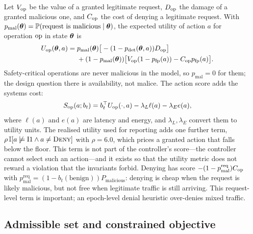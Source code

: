 Let $V_{\mathrm{op}}$ be the value of a granted legitimate request, $D_{\mathrm{op}}$ the damage
of a granted malicious one, and $C_{\mathrm{op}}$ the cost of denying a legitimate
request. With $p_{\mathrm{mal}}(\boldsymbol{\theta})=\mathbb{P}(\text{request is malicious}\mid\boldsymbol{\theta})$,
the expected utility of action $a$ for operation $\mathrm{op}$ in state $\boldsymbol{\theta}$ is
\begin{equation}
\begin{aligned}
  U_{\mathrm{op}}(\boldsymbol{\theta},a)={}&
  p_{\mathrm{mal}}(\boldsymbol{\theta})\big[-(1-p_{\mathrm{det}}(\boldsymbol{\theta},a))D_{\mathrm{op}}\big]\\
  &+(1-p_{\mathrm{mal}}(\boldsymbol{\theta}))\big[V_{\mathrm{op}}(1-p_{\mathrm{fp}}(a))-C_{\mathrm{op}}p_{\mathrm{fp}}(a)\big].
\end{aligned}
  \label{eq:utility}
\end{equation}
Safety-critical operations are never malicious in the model, so
$p_{\mathrm{mal}}=0$ for them; the design question there is availability, not
malice. The action score adds the systems cost:
\begin{equation}
  S_{\mathrm{op}}(a;b_t)=b_t^{\top}U_{\mathrm{op}}(\cdot,a)
  -\lambda_L\ell(a)-\lambda_E e(a),
  \label{eq:score}
\end{equation}
where $\ell(a)$ and $e(a)$ are latency and energy, and $\lambda_L,\lambda_E$
convert them to utility units. The realised utility used for reporting adds one
further term, $\rho\,\mathbb{I}\!\left[a\not\models\mathrm{I1}\land a\neq\textsc{Deny}\right]$
with $\rho=6.0$, which prices a granted action that falls below the floor. This
term is not part of the controller's score---the controller cannot select such
an action---and it exists so that the utility metric does not reward a violation
that the invariants forbid. Denying has score
$-(1-p_{\mathrm{mal}}^{\mathrm{req}})C_{\mathrm{op}}$ with
$p_{\mathrm{mal}}^{\mathrm{req}}=(1-b_t(\text{benign}))P_{\mathrm{malicious}}$:
denying is cheap when the request is likely malicious, but not free when
legitimate traffic is still arriving. This request-level term is important; an
epoch-level denial heuristic over-denies mixed traffic.

\subsection{Admissible set and constrained objective}
\label{sec:admissible}

